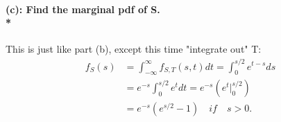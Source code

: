 \paragraph{(c): Find the marginal pdf of S.\\*}
This is just like part (b), except this time "integrate out" T:
\begin{equation} \begin{split}f_S(s) & = \int_{-\infty}^{\infty}f_{S,T}(s,t)dt = \int_{0}^{s/2}e^{t-s}ds \\ 
&=e^{-s}\int_{0}^{s/2}e^{t}dt=e^{-s}(e^{t}\rvert^{s/2}_{0}) \\ & =e^{-s}(e^{s/2}-1) \quad if \quad s>0.  \end{split} \end{equation}
